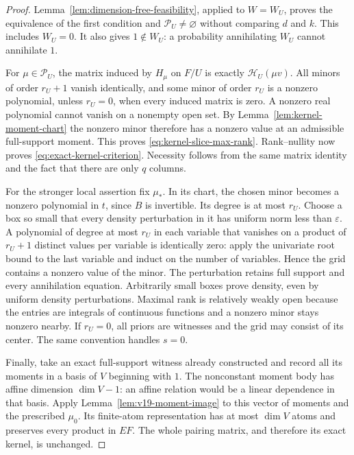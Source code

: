 \documentclass[11pt]{amsart}
\theoremstyle{definition}\newtheorem{definition}[theorem]{Definition}
\theoremstyle{remark}\newtheorem{remark}[theorem]{Remark}
\begin{document}
\begin{proof}
Lemma~\ref{lem:dimension-free-feasibility}, applied to $W=W_U$,
proves the equivalence of the first condition and
$\mathcal P_U\ne\varnothing$ without comparing $d$ and $k$.
This includes $W_U=0$. It also gives $1\notin W_U$:
a probability annihilating $W_U$ cannot annihilate $1$.

For $\mu\in\mathcal P_U$, the matrix induced by $H_\mu$ on $F/U$
is exactly $\mathscr H_U(\mu v)$. All minors of order $r_U+1$
vanish identically, and some minor of order $r_U$ is a nonzero
polynomial, unless $r_U=0$, when every induced matrix is zero.
A nonzero real polynomial cannot vanish on a nonempty open set. By
Lemma~\ref{lem:kernel-moment-chart} the nonzero minor therefore has a
nonzero value at an admissible full-support moment. This proves
\eqref{eq:kernel-slice-max-rank}. Rank--nullity now proves
\eqref{eq:exact-kernel-criterion}. Necessity follows from the same
matrix identity and the fact that there are only $q$ columns.

For the stronger local assertion fix $\mu_*$. In its chart, the chosen
minor becomes a nonzero polynomial in $t$, since $B$ is invertible.
Its degree is at most $r_U$. Choose a box so small that every density
perturbation in it has uniform norm less than $\varepsilon$. A
polynomial of degree at most $r_U$ in each variable that vanishes on a
product of $r_U+1$ distinct values per variable is identically zero:
apply the univariate root bound to the last variable and induct on the
number of variables. Hence the grid contains a nonzero value of the
minor. The perturbation retains full support and every annihilation
equation. Arbitrarily small boxes prove density, even by uniform density
perturbations. Maximal rank is relatively weakly open because the
entries are integrals of continuous functions and a nonzero minor stays
nonzero nearby. If $r_U=0$, all priors are witnesses and the grid may
consist of its center. The same convention handles $s=0$.

Finally, take an exact full-support witness already constructed and
record all its moments in a basis of $V$ beginning with $1$. The
nonconstant moment body has affine dimension $\dim V-1$: an affine
relation would be a linear dependence in that basis. Apply
Lemma~\ref{lem:v19-moment-image} to this vector of moments and the
prescribed $\mu_0$. Its finite-atom representation has at most $\dim V$
atoms and preserves every product in $EF$. The whole pairing matrix,
and therefore its exact kernel, is unchanged.
\end{proof}
\end{document}

